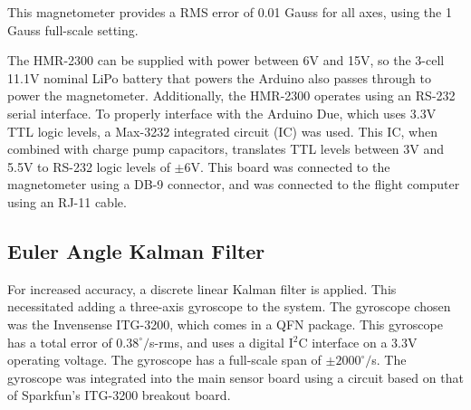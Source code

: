 This magnetometer provides a RMS error of 0.01 Gauss for all axes, using the 1 Gauss full-scale setting\cite{hmr2300DataSheet}. 

The HMR-2300 can be supplied with power between 6V and 15V, so the 3-cell 11.1V nominal LiPo battery that powers the Arduino also passes through to power the magnetometer. Additionally, the HMR-2300 operates using an RS-232 serial interface. To properly interface with the Arduino Due, which uses 3.3V TTL logic levels, a Max-3232 integrated circuit (IC) was used. This IC, when combined with charge pump capacitors, translates TTL levels between 3V and 5.5V to RS-232 logic levels of $\pm6$V.
 This board was connected to the magnetometer using a DB-9 connector, and was connected to the flight computer using an RJ-11 cable.
\subsection*{Euler Angle Kalman Filter}
For increased accuracy, a discrete linear Kalman filter is applied. This necessitated adding a three-axis gyroscope to the system. The gyroscope chosen was the Invensense ITG-3200, which comes in a QFN package. This gyroscope has a total error of $0.38^\circ/$s-rms\cite{itg3200DataSheet}, and uses a digital I$^2$C interface on a 3.3V operating voltage. The gyroscope has a full-scale span of $\pm2000^\circ/$s. The gyroscope was integrated into the main sensor board using a circuit based on that of Sparkfun's ITG-3200 breakout board\cite{itg3200BOBSchematic}.


